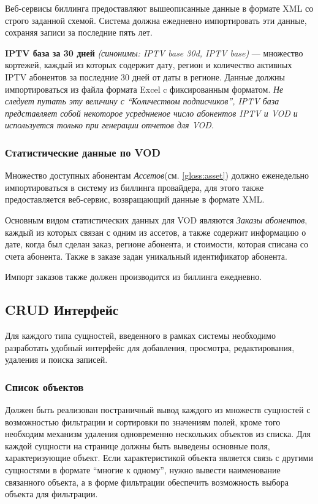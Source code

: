 Веб-сервисы биллинга предоставляют вышеописанные данные в формате XML со строго заданной схемой. Система должна ежедневно импортировать эти данные,
сохраняя записи за последние пять лет.

\textbf{IPTV база за 30 дней} \textit{(синонимы: IPTV base 30d, IPTV base)} --- множество кортежей, каждый из которых содержит дату,
регион и количество активных IPTV абонентов за последние 30 дней от даты в регионе. 
Данные должны импортироваться из файла формата Excel c фиксированным форматом.
\textit{Не следует путать эту величину с ``Количеством подписчиков'',  IPTV база представляет собой некоторое усреднненое число 
абонентов IPTV и VOD и используется только при генерации отчетов для VOD.}

\subsubsection{Статистические данные по VOD}
\label{stat:vod}
Множество доступных абонентам \textit{Ассетов}(см. \ref{gloss:asset}) должно еженедельно импортироваться в систему из 
биллинга провайдера, для этого также предоставляется веб-сервис, возвращающий данные в формате XML.

Основным видом статистических данных для VOD являются \textit{Заказы абонентов}, каждый из которых связан с одним из ассетов,
а также содержит информацию о дате, когда был сделан заказ, регионе абонента, и стоимости, которая списана со счета абонента.
Также в заказе задан уникальный идентификатор абонента.

Импорт заказов также должен производится из биллинга ежедневно.

\subsection{CRUD Интерфейс} 
\label{section:crud}
Для каждого типа сущностей, введенного в рамках системы необходимо разработать удобный интерфейс для добавления, 
просмотра, редактирования, удаления и поиска записей.

\subsubsection{Список объектов}
\label{crud:list}
Должен быть реализован постраничный вывод каждого из множеств сущностей с возможностью фильтрации и сортировки
по значениям полей, кроме того необходим механизм удаления одновременно нескольких объектов из списка.
Для каждой сущности на странице должны быть выведены основные поля, характеризующие объект.
Если характеристикой объекта является связь с другими сущностями в формате ``многие к одному'',
нужно вывести наименование связанного объекта, а в форме фильтрации обеспечить возможность выбора объекта
для фильтрации. 

